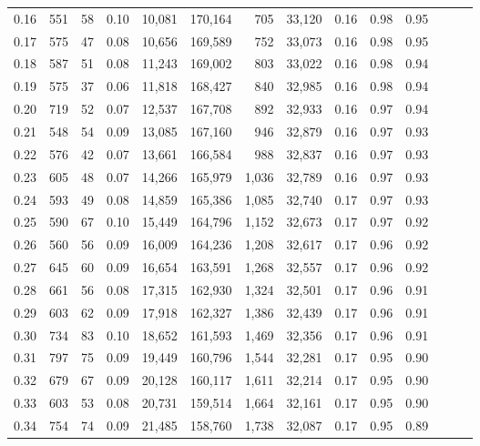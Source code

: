 \begin{tabular}{rrrrrrrrrrrrrr}
0.16 &    551 &     58 &  0.10 &   10,081 &  170,164 &     705 &  33,120 &  0.16 &  0.98 &      0.95 \\
0.17 &    575 &     47 &  0.08 &   10,656 &  169,589 &     752 &  33,073 &  0.16 &  0.98 &      0.95 \\
0.18 &    587 &     51 &  0.08 &   11,243 &  169,002 &     803 &  33,022 &  0.16 &  0.98 &      0.94 \\
0.19 &    575 &     37 &  0.06 &   11,818 &  168,427 &     840 &  32,985 &  0.16 &  0.98 &      0.94 \\
0.20 &    719 &     52 &  0.07 &   12,537 &  167,708 &     892 &  32,933 &  0.16 &  0.97 &      0.94 \\
0.21 &    548 &     54 &  0.09 &   13,085 &  167,160 &     946 &  32,879 &  0.16 &  0.97 &      0.93 \\
0.22 &    576 &     42 &  0.07 &   13,661 &  166,584 &     988 &  32,837 &  0.16 &  0.97 &      0.93 \\
0.23 &    605 &     48 &  0.07 &   14,266 &  165,979 &   1,036 &  32,789 &  0.16 &  0.97 &      0.93 \\
0.24 &    593 &     49 &  0.08 &   14,859 &  165,386 &   1,085 &  32,740 &  0.17 &  0.97 &      0.93 \\
0.25 &    590 &     67 &  0.10 &   15,449 &  164,796 &   1,152 &  32,673 &  0.17 &  0.97 &      0.92 \\
0.26 &    560 &     56 &  0.09 &   16,009 &  164,236 &   1,208 &  32,617 &  0.17 &  0.96 &      0.92 \\
0.27 &    645 &     60 &  0.09 &   16,654 &  163,591 &   1,268 &  32,557 &  0.17 &  0.96 &      0.92 \\
0.28 &    661 &     56 &  0.08 &   17,315 &  162,930 &   1,324 &  32,501 &  0.17 &  0.96 &      0.91 \\
0.29 &    603 &     62 &  0.09 &   17,918 &  162,327 &   1,386 &  32,439 &  0.17 &  0.96 &      0.91 \\
0.30 &    734 &     83 &  0.10 &   18,652 &  161,593 &   1,469 &  32,356 &  0.17 &  0.96 &      0.91 \\
0.31 &    797 &     75 &  0.09 &   19,449 &  160,796 &   1,544 &  32,281 &  0.17 &  0.95 &      0.90 \\
0.32 &    679 &     67 &  0.09 &   20,128 &  160,117 &   1,611 &  32,214 &  0.17 &  0.95 &      0.90 \\
0.33 &    603 &     53 &  0.08 &   20,731 &  159,514 &   1,664 &  32,161 &  0.17 &  0.95 &      0.90 \\
0.34 &    754 &     74 &  0.09 &   21,485 &  158,760 &   1,738 &  32,087 &  0.17 &  0.95 &      0.89 \\

\end{tabular}
